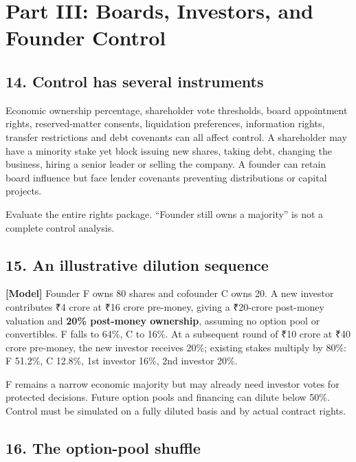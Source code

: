 \section*{Part III: Boards, Investors, and Founder Control}

\subsection{14. Control has several instruments}

Economic ownership percentage, shareholder vote thresholds, board appointment rights, reserved-matter consents, liquidation preferences, information rights, transfer restrictions and debt covenants can all affect control. A shareholder may have a minority stake yet block issuing new shares, taking debt, changing the business, hiring a senior leader or selling the company. A founder can retain board influence but face lender covenants preventing distributions or capital projects.

Evaluate the entire rights package. ``Founder still owns a majority'' is not a complete control analysis.

\subsection{15. An illustrative dilution sequence}

\textbf{[Model]} Founder F owns 80 shares and cofounder C owns 20. A new investor contributes \textnormal{₹}4 crore at \textnormal{₹}16 crore pre-money, giving a \textnormal{₹}20-crore post-money valuation and \textbf{20\% post-money ownership}, assuming no option pool or convertibles. F falls to 64\%, C to 16\%. At a subsequent round of \textnormal{₹}10 crore at \textnormal{₹}40 crore pre-money, the new investor receives 20\%; existing stakes multiply by 80\%: F 51.2\%, C 12.8\%, 1st investor 16\%, 2nd investor 20\%.

F remains a narrow economic majority but may already need investor votes for protected decisions. Future option pools and financing can dilute below 50\%. Control must be simulated on a fully diluted basis and by actual contract rights.

\subsection{16. The option-pool shuffle}

